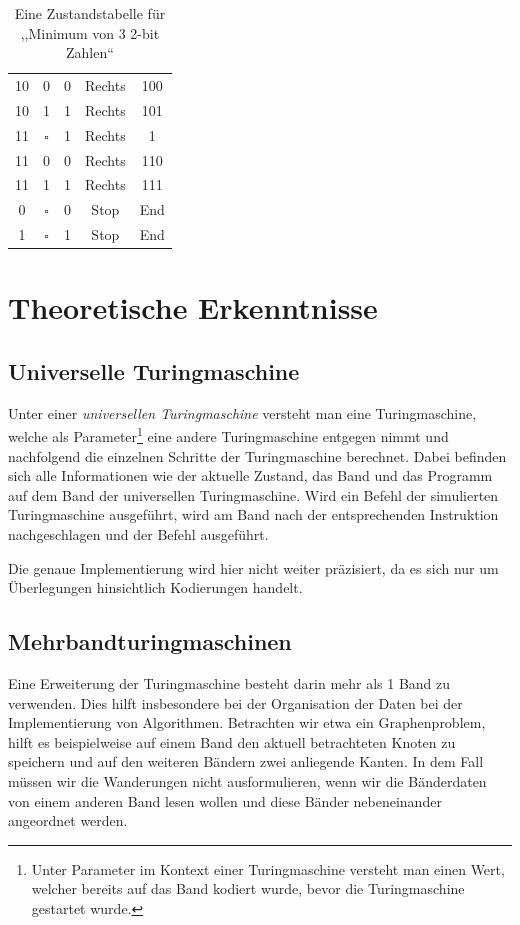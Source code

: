 \begin{table}
\begin{center}
\begin{tabular}{ccccc}
    10      & 0         & 0         & Rechts   & 100 \\
    10      & 1         & 1         & Rechts   & 101 \\
    11      & $\square$ & 1         & Rechts   & 1 \\
    11      & 0         & 0         & Rechts   & 110 \\
    11      & 1         & 1         & Rechts   & 111 \\
    0       & $\square$ & 0         & Stop     & End \\
    1       & $\square$ & 1         & Stop     & End \\
   \hline
  \end{tabular}
  \caption{Eine Zustandstabelle für ,,Minimum von 3 2-bit Zahlen``}
  \label{tab:min_3bit}
 \end{center}
\end{table}

\section{Theoretische Erkenntnisse}
\subsection{Universelle Turingmaschine}
%
Unter einer \emph{universellen Turingmaschine} versteht man eine Turingmaschine, welche als Parameter\footnote{Unter Parameter im Kontext einer Turingmaschine versteht man einen Wert, welcher bereits auf das Band kodiert wurde, bevor die Turingmaschine gestartet wurde.} eine andere Turingmaschine entgegen nimmt und nachfolgend die einzelnen Schritte der Turingmaschine berechnet. Dabei befinden sich alle Informationen wie der aktuelle Zustand, das Band und das Programm auf dem Band der universellen Turingmaschine. Wird ein Befehl der simulierten Turingmaschine ausgeführt, wird am Band nach der entsprechenden Instruktion nachgeschlagen und der Befehl ausgeführt.

Die genaue Implementierung wird hier nicht weiter präzisiert, da es sich nur um Überlegungen hinsichtlich Kodierungen handelt.
%
\subsection{Mehrbandturingmaschinen}
%
Eine Erweiterung der Turingmaschine besteht darin mehr als 1 Band zu verwenden. Dies hilft insbesondere bei der Organisation der Daten bei der Implementierung von Algorithmen. Betrachten wir etwa ein Graphenproblem, hilft es beispielweise auf einem Band den aktuell betrachteten Knoten zu speichern und auf den weiteren Bändern zwei anliegende Kanten. In dem Fall müssen wir die Wanderungen nicht ausformulieren, wenn wir die Bänderdaten von einem anderen Band lesen wollen und diese Bänder nebeneinander angeordnet werden.

